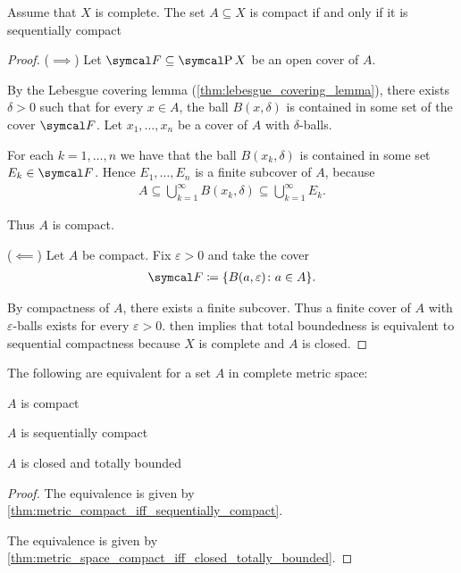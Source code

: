 \begin{theorem}\label{thm:metric_compact_iff_sequentially_compact}
  Assume that $X$ is complete. The set $A \subseteq X$ is compact if and only if it is sequentially compact
\end{theorem}
\begin{proof}
  ($\implies$) Let $\Cal{F} \subseteq \Power X$ be an open cover of $A$.

  By the Lebesgue covering lemma (\cref{thm:lebesgue_covering_lemma}), there exists $\delta > 0$ such that for every $x \in A$, the ball $B(x, \delta)$ is contained in some set of the cover $\Cal{F}$. Let $x_1, \ldots, x_n$ be a cover of $A$ with $\delta$-balls.

  For each $k = 1, \ldots, n$ we have that the ball $B(x_k, \delta)$ is contained in some set $E_k \in \Cal{F}$. Hence $E_1, \ldots, E_n$ is a finite subcover of $A$, because
  \begin{align*}
    A \subseteq \bigcup_{k=1}^\infty B(x_k, \delta) \subseteq \bigcup_{k=1}^\infty E_k.
  \end{align*}

  Thus $A$ is compact.

  ($\impliedby$) Let $A$ be compact. Fix $\varepsilon > 0$ and take the cover
  \begin{align*}
    \Cal{F} \coloneqq \{ B(a, \varepsilon) \colon a \in A \}.
  \end{align*}

  By compactness of $A$, there exists a finite subcover. Thus a finite cover of $A$ with $\varepsilon$-balls exists for every $\varepsilon > 0$.  then implies that total boundedness is equivalent to sequential compactness because $X$ is complete and $A$ is closed.
\end{proof}

\begin{corollary}\label{thm:complete_metric_space_compact_conditions}
  The following are equivalent for a set $A$ in complete metric space:
  \begin{defenum}
    \item\label{thm:complete_metric_space_compact_conditions/compact} $A$ is compact
    \item\label{thm:complete_metric_space_compact_conditions/sequentially_compact} $A$ is sequentially compact
    \item\label{thm:complete_metric_space_compact_conditions/closed_totally_bounded} $A$ is closed and totally bounded
  \end{defenum}
\end{corollary}
\begin{proof}
   The equivalence is given by \cref{thm:metric_compact_iff_sequentially_compact}.

   The equivalence is given by \cref{thm:metric_space_compact_iff_closed_totally_bounded}.
\end{proof}
